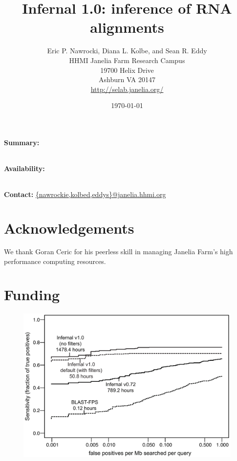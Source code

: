 \documentclass[11pt]{article}
\begin{document}
\title{Infernal 1.0: inference of RNA alignments}
\author{Eric P. Nawrocki, Diana L. Kolbe, and Sean R. Eddy\\
HHMI Janelia Farm Research Campus\\
19700 Helix Drive\\
Ashburn VA 20147\\
\url{http://selab.janelia.org/}\\
}
\date{\today}
\maketitle

\textbf{Summary:}

\\
\textbf{Availability:}

\\
\textbf{Contact:} \url{{nawrockie,kolbed,eddys}@janelia.hhmi.org}






\section{Acknowledgements}
We thank Goran Ceric for his peerless skill in managing Janelia Farm's
high performance computing resources.

\section{Funding}





\newpage

\begin{figure}
\begin{center}
\includegraphics[width=6.4in]{figs/roc}

\label{Fig:roc}
\end{center}
\end{figure}

\newpage

\begin{table}
\begin{center}

\end{center}

\label{Tab:timings}
\end{table}
\end{document}
